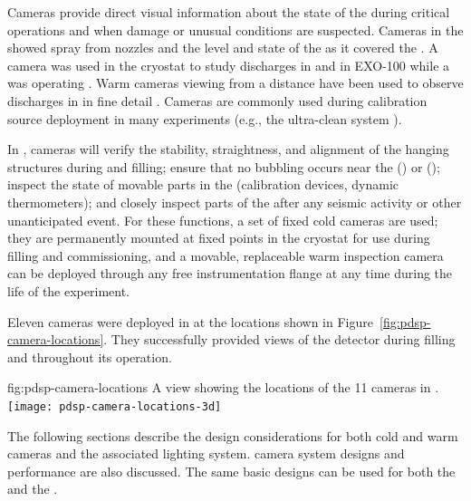 Cameras provide direct visual information about the state of the
 during critical operations and when damage or unusual
conditions are suspected.  Cameras in the  showed spray from \cooldown
nozzles and the level and state of the  as it covered the  \cite{Murphy:20170516}.  A camera was
used in the  
cryostat\cite{Adamowski:2014daa} to study  discharges in
 and in EXO-100 while a  was operating
\cite{Delaquis:2013hva}.  Warm cameras viewing  from a distance
have been used to observe  discharges in  in
fine detail \cite{Auger:2015xlo}.  Cameras are commonly used during
calibration source deployment in many experiments (e.g., the
\kamland ultra-clean system \cite{Banks:2014hra}).

In , cameras will verify the stability, straightness,
and alignment of the hanging  structures during \cooldown and
filling; ensure that no bubbling occurs near the 
(\single) or  (\dual);  inspect the
state of movable parts in the  (calibration devices, dynamic
thermometers); and  closely inspect parts of the  after any seismic activity or other unanticipated
event.  For these functions, a set of fixed
cold cameras are used; they are permanently mounted at fixed points in the cryostat
for use during filling and commissioning, and a movable, replaceable
warm inspection camera can be deployed through any free
instrumentation flange at any time during the life of the
experiment. 

Eleven cameras were deployed in  at the locations shown in Figure~\ref{fig:pdsp-camera-locations}. They successfully provided views of the detector during filling and throughout %
its operation. %

\begin{dunefigure}{fig:pdsp-camera-locations}
  {A \threed view showing the locations of the 11 cameras in .}
  \texttt{[image: pdsp-camera-locations-3d]}%
\end{dunefigure}

The following sections describe the design considerations for both cold
and warm cameras and the associated lighting system.  camera system designs and performance are also discussed.  
The same basic
designs can be used for both the  and the . %



